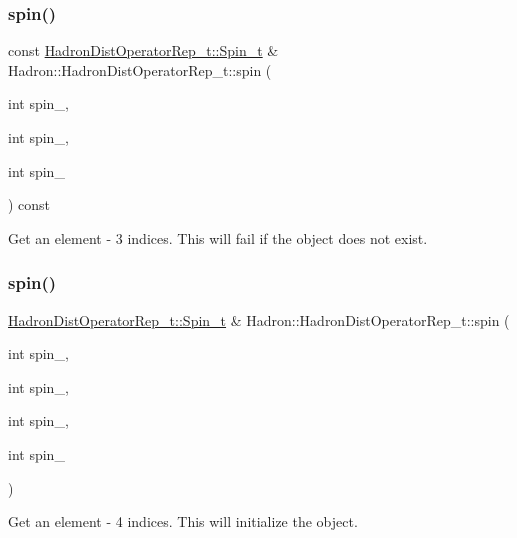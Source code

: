 \subsubsection{\texorpdfstring{spin()}{spin()}\hspace{0.1cm}{\footnotesize\ttfamily [4/8]}}
{\footnotesize\ttfamily const \mbox{\hyperlink{structHadron_1_1HadronDistOperatorRep__t_1_1Spin__t}{Hadron\+Dist\+Operator\+Rep\+\_\+t\+::\+Spin\+\_\+t}} \& Hadron\+::\+Hadron\+Dist\+Operator\+Rep\+\_\+t\+::spin (\begin{DoxyParamCaption}\item[{int}]{spin\+\_,  }\item[{int}]{spin\+\_,  }\item[{int}]{spin\+\_ }\end{DoxyParamCaption}) const}



Get an element -\/ 3 indices. This will fail if the object does not exist. 

\mbox{\label{classHadron_1_1HadronDistOperatorRep__t_a42ba0b0eff80de32178f0cee67dcbfa1}} 
\subsubsection{\texorpdfstring{spin()}{spin()}\hspace{0.1cm}{\footnotesize\ttfamily [5/8]}}
{\footnotesize\ttfamily \mbox{\hyperlink{structHadron_1_1HadronDistOperatorRep__t_1_1Spin__t}{Hadron\+Dist\+Operator\+Rep\+\_\+t\+::\+Spin\+\_\+t}} \& Hadron\+::\+Hadron\+Dist\+Operator\+Rep\+\_\+t\+::spin (\begin{DoxyParamCaption}\item[{int}]{spin\+\_,  }\item[{int}]{spin\+\_,  }\item[{int}]{spin\+\_,  }\item[{int}]{spin\+\_ }\end{DoxyParamCaption})}



Get an element -\/ 4 indices. This will initialize the object. 

\mbox{\label{classHadron_1_1HadronDistOperatorRep__t_a61528fe44909a8f4926e21b54681c1e0}} 
